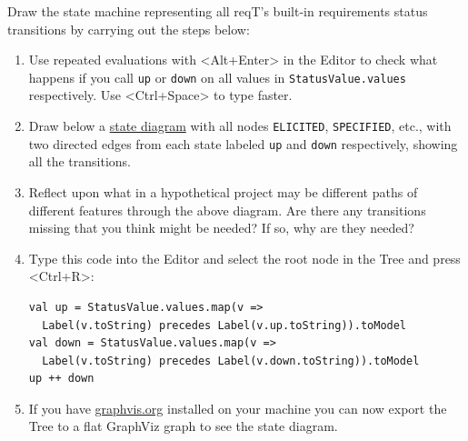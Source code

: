 \documentclass[11pt]{article}
\begin{document}
\newpage %
\begin{framed}
\noindent Draw the state machine representing all reqT's built-in requirements status transitions by carrying out the steps below:
\begin{enumerate}
\item Use repeated evaluations with <Alt+Enter> in the Editor to check what happens if you call \verb+up+ or  \verb+down+ on all values in \verb+StatusValue.values+ respectively. Use <Ctrl+Space> to type faster. 
\item Draw below a \href{http://en.wikipedia.org/wiki/State_diagram}{state diagram} with all nodes \verb+ELICITED+, \verb+SPECIFIED+, etc., with two directed edges from each state labeled \verb+up+ and \verb+down+ respectively, showing all the transitions. \newline
\vspace{7cm}
\item Reflect upon what in a hypothetical project may be different paths of different features through the above diagram. Are there any transitions missing that you think might be needed? If so, why are they needed?
\item Type this code into the Editor and select the root node in the Tree and press <Ctrl+R>:{\scriptsize\begin{verbatim}
val up = StatusValue.values.map(v => 
  Label(v.toString) precedes Label(v.up.toString)).toModel
val down = StatusValue.values.map(v => 
  Label(v.toString) precedes Label(v.down.toString)).toModel
up ++ down
\end{verbatim}}
\item If you have \url{graphvis.org} installed on your machine you can now export the Tree to a flat GraphViz graph to see the state diagram.
\end{enumerate}
\end{framed}
\end{document}

